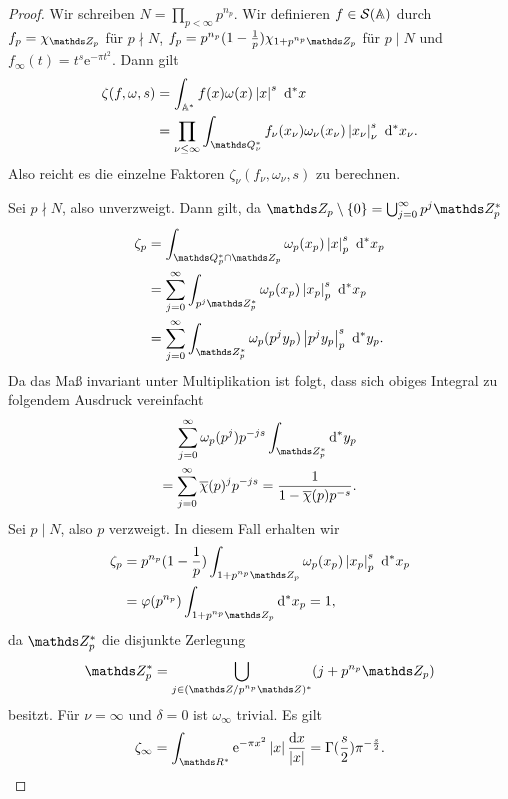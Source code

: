 \begin{proof}
Wir schreiben $N=\prod_{p<\infty} p^{n_p}$. Wir definieren $f\in \mathcal{S}(\mathbb{A})$ durch $f_p=\chi_{\Z_p}$ für $p \nmid N$, $f_p=p^{n_p}(1-\frac{1}{p})\chi_{1+p^{n_p}\Z_p}$ für $p \mid N$ und $f_\infty(t)=t^s \mathrm{e}^{-\pi t^2}$.
Dann gilt
\begin{align*}
\zeta(f,\omega,s)&=\int_{\A^\ast} f(x)\omega(x)\abs{x}^s~\mathrm{d}^\ast x\\
&=\prod_{\nu \leq \infty} \int_{\Q_\nu^\ast} f_\nu(x_\nu)\omega_\nu(x_\nu)\abs{x_\nu}_\nu^s~\mathrm{d}^\ast x_\nu.
\end{align*}
Also reicht es die einzelne Faktoren $\zeta_\nu(f_\nu,\omega_\nu,s)$ zu berechnen.

Sei $p \nmid N$, also unverzweigt. Dann gilt, da $\Z_p\setminus \{0\}=\bigcup_{j=0}^\infty p^j\Z_p^\ast$
\begin{align*}
\zeta_p &=\int_{\Q_p^\ast \cap \Z_p} \omega_p(x_p)\abs{x}_p^s~\mathrm{d}^\ast x_p\\
&=\sum_{j=0}^\infty \int_{p^j\Z_p^\ast} \omega_p(x_p)\abs{x_p}_p^s ~\mathrm{d}^\ast x_p\\
&=\sum_{j=0}^\infty \int_{\Z_p^\ast} \omega_p(p^jy_p)\abs{p^jy_p}_p^s~\mathrm{d}^\ast y_p.
\end{align*}
Da das Maß invariant unter Multiplikation ist folgt, dass sich obiges Integral zu folgendem Ausdruck vereinfacht
\begin{align*}
\sum_{j=0}^\infty \omega_p(p^j)p^{-js} \int_{\Z_p^\ast} \mathrm{d}^\ast y_p\\
=\sum_{j=0}^\infty \overline{\chi}(p)^j p^{-js}=\frac{1}{1-\overline{\chi}(p)p^{-s}}.
\end{align*}
Sei $p \mid N$, also $p$ verzweigt. In diesem Fall erhalten wir
\begin{align*}
\zeta_p&=p^{n_p}(1-\frac{1}{p})\int_{1+p^{n_p}\Z_p} \omega_p(x_p)\abs{x_p}_p^s~\mathrm{d}^\ast x_p\\
&=\varphi(p^{n_p})\int_{1+p^{n_p}\Z_p} \mathrm{d}^\ast x_p =1,
\end{align*}
da $\Z_p^\ast$ die disjunkte Zerlegung
\begin{align*}
\Z_p^\ast=\bigcup_{j \in (\Z/p^{n_p}\Z)^\ast} (j+p^{n_p} \Z_p)
\end{align*}
besitzt.
Für $\nu=\infty$ und $\delta=0$ ist $\omega_\infty$ trivial.
Es gilt
\begin{align*}
\zeta_\infty=\int_{\R^\ast} \mathrm{e}^{-\pi x^2}\abs{x}\frac{\mathrm{d}x}{\abs{x}}=\Gamma(\frac{s}{2})\pi^{-\frac{s}{2}}.
\end{align*}

\end{proof}
